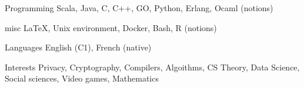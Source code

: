 


\begin{cvskills}


\cvskill
{Programming} %
{Scala, Java, C, C++, GO, Python, Erlang, Ocaml (notions)} %


\cvskill
{misc} %
{\LaTeX, Unix environment, Docker, Bash, R (notions)} %


\cvskill
{Languages} %
{English (C1), French (native)} %


\cvskill
{Interests} %
{Privacy, Cryptography, Compilers, Algoithms, CS Theory, Data Science, Social sciences, Video games, Mathematics} %


\end{cvskills}